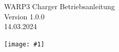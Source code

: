 \documentclass[a4paper,10pt]{article}
\title{}
\author{}
\newcommand{\gfx}[1]{\texttt{[image: \#1]}}
\begin{document}
\pagestyle{empty}
\begin{titlepage}
    \vspace*{-3.08cm}
    \colorbox{covergray}{}
    \vfill
    \begin{center}
		\color{white}
        \Huge
        WARP3 Charger Betriebsanleitung\\\vspace{1cm}
        \large
        Version 1.0.0\\\vspace{0.25cm}
        14.03.2024
    \end{center}
    \vfill \gfx{./img_warp3/resized/front.png}
	\pagecolor{covergray}\afterpage{\nopagecolor}
\end{titlepage}
\newpage
\null
\newpage
\pagestyle{fancy}
\end{document}
